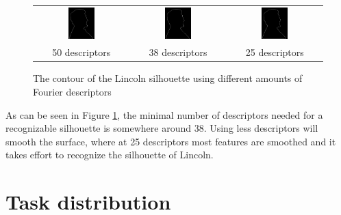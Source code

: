 \documentclass[a4paper]{article}
\begin{document}
\begin{enumerate}
\begin{figure}[H]
\begin{tabular}{ccc}
        \includegraphics[width=0.3\textwidth]{../lab5ex3/contour-50.png} & \includegraphics[width=0.3\textwidth]{../lab5ex3/contour-38.png} & \includegraphics[width=0.3\textwidth]{../lab5ex3/contour-25.png} \\
    50 descriptors &  38 descriptors & 25 descriptors \\
\end{tabular}
\caption{The contour of the Lincoln silhouette using different amounts of Fourier descriptors}
\label{fig:contour}
\end{figure}

As can be seen in Figure \ref{fig:contour}, the minimal number of descriptors needed for a recognizable silhouette is somewhere around 38. 
Using less descriptors will smooth the surface, where at 25 descriptors most features are smoothed and it takes effort to recognize the silhouette of Lincoln.

\end{enumerate}

\section*{Task distribution}
\end{document}
